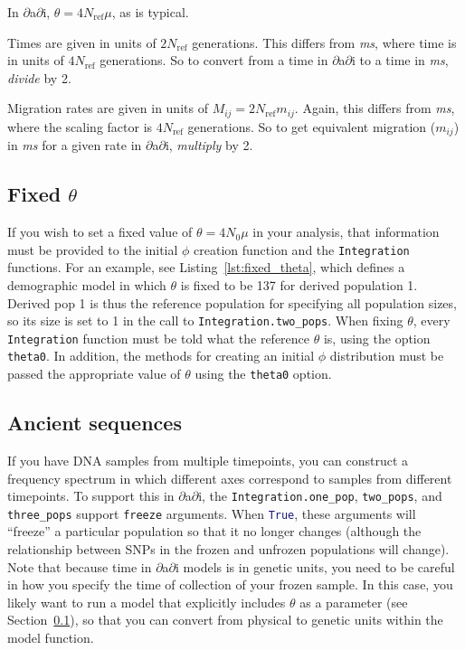 \documentclass[12pt]{article}
\makeatletter
\newcommand{\dadi}{$\partial$a$\partial$i\xspace}
\newcommand{\Nref}{\ensuremath{N_\text{ref}}\xspace}
\newcommand{\ms}{\emph{ms}\xspace}
\newcommand{\py}[1]{\lstinline[language=Python, showstringspaces=False]@#1@}
\makeatother
\begin{document}
In \dadi, $\theta = 4 \Nref \mu$, as is typical.

Times are given in units of $2 \Nref$ generations.
This differs from \emph{ms}, where time is in units of $4 \Nref$ generations.
So to convert from a time in \dadi to a time in \emph{ms}, \emph{divide} by 2.

Migration rates are given in units of $M_{ij} = 2 \Nref m_{ij}$.
Again, this differs from \emph{ms}, where the scaling factor is $4 \Nref$ generations.
So to get equivalent migration ($m_{ij}$) in \ms for a given rate in \dadi, \emph{multiply} by 2.


\subsection{Fixed $\theta$}\label{sec:fixed_theta}

If you wish to set a fixed value of $\theta = 4 N_0 \mu$ in your analysis, that information must be provided to the initial $\phi$ creation function and the \py{Integration} functions.
For an example, see Listing~\ref{lst:fixed_theta}, which defines a demographic model in which $\theta$ is fixed to be 137 for derived population 1.
Derived pop 1 is thus the reference population for specifying all population sizes, so its size is set to 1 in the call to \py{Integration.two_pops}.
When fixing $\theta$, every \py{Integration} function must be told what the reference $\theta$ is, using the option \py{theta0}.
In addition, the methods for creating an initial $\phi$ distribution must be passed the appropriate value of $\theta$ using the \py{theta0} option.

\subsection{Ancient sequences}\label{sec:ancient_sequences}

If you have DNA samples from multiple timepoints, you can construct a frequency spectrum in which different axes correspond to samples from different timepoints.
To support this in \dadi, the \py{Integration.one_pop}, \py{two_pops}, and \py{three_pops} support \py{freeze} arguments.
When \py{True}, these arguments will ``freeze'' a particular population so that it no longer changes (although the relationship between SNPs in the frozen and unfrozen populations will change).
Note that because time in \dadi models is in genetic units, you need to be careful in how you specify the time of collection of your frozen sample.
In this case, you likely want to run a model that explicitly includes $\theta$ as a parameter (see Section~\ref{sec:fixed_theta}), so that you can convert from physical to genetic units within the model function.
\end{document}
